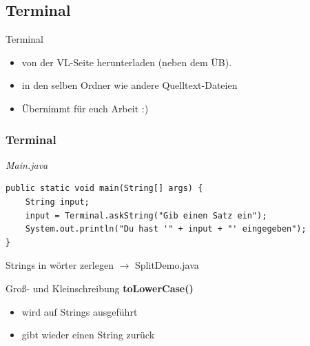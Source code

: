 \documentclass[18pt]{beamer}
\begin{document}
\subsection{Terminal}
\begin{frame}{Terminal}
	
	\begin{itemize}
		\item von der VL-Seite herunterladen (neben dem ÜB).
		\item in den selben Ordner wie andere Quelltext-Dateien
		\item Übernimmt für euch Arbeit :)
	\end{itemize}
	
\end{frame}


\begin{frame}[containsverbatim]
	\frametitle{Terminal}
	\emph{Main.java}
	\begin{lstlisting}
public static void main(String[] args) {
	String input;
	input = Terminal.askString("Gib einen Satz ein");
	System.out.println("Du hast '" + input + "' eingegeben");
}
	\end{lstlisting}
\end{frame}


\begin{frame}{Strings in wörter zerlegen}
	$\rightarrow$ SplitDemo.java
\end{frame}


\begin{frame}{Groß- und Kleinschreibung}
	\textbf{toLowerCase()}

	\begin{itemize}
		\item wird auf Strings ausgeführt
		\item gibt wieder einen String zurück
	\end{itemize}
\end{frame}

\end{document}
